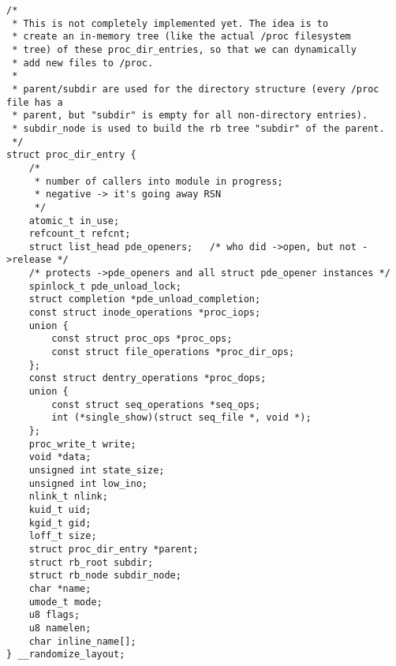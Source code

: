 
\begin{lstlisting}
/*
 * This is not completely implemented yet. The idea is to
 * create an in-memory tree (like the actual /proc filesystem
 * tree) of these proc_dir_entries, so that we can dynamically
 * add new files to /proc.
 *
 * parent/subdir are used for the directory structure (every /proc file has a
 * parent, but "subdir" is empty for all non-directory entries).
 * subdir_node is used to build the rb tree "subdir" of the parent.
 */
struct proc_dir_entry {
	/*
	 * number of callers into module in progress;
	 * negative -> it's going away RSN
	 */
	atomic_t in_use;
	refcount_t refcnt;
	struct list_head pde_openers;	/* who did ->open, but not ->release */
	/* protects ->pde_openers and all struct pde_opener instances */
	spinlock_t pde_unload_lock;
	struct completion *pde_unload_completion;
	const struct inode_operations *proc_iops;
	union {
		const struct proc_ops *proc_ops;
		const struct file_operations *proc_dir_ops;
	};
	const struct dentry_operations *proc_dops;
	union {
		const struct seq_operations *seq_ops;
		int (*single_show)(struct seq_file *, void *);
	};
	proc_write_t write;
	void *data;
	unsigned int state_size;
	unsigned int low_ino;
	nlink_t nlink;
	kuid_t uid;
	kgid_t gid;
	loff_t size;
	struct proc_dir_entry *parent;
	struct rb_root subdir;
	struct rb_node subdir_node;
	char *name;
	umode_t mode;
	u8 flags;
	u8 namelen;
	char inline_name[];
} __randomize_layout;
\end{lstlisting}
